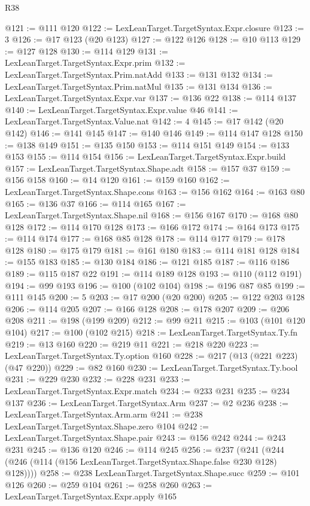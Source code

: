 \begin{lexlean}{R38}
\begin{coremodule}
@121 := @111 @120
@122 := LexLeanTarget.TargetSyntax.Expr.closure
@123 := 3
@126 := @17 @123 (@20 @123)
@127 := @122 @126
@128 := @10 @113
@129 := @127 @128
@130 := @114 @129
@131 := LexLeanTarget.TargetSyntax.Expr.prim
@132 := LexLeanTarget.TargetSyntax.Prim.natAdd
@133 := @131 @132
@134 := LexLeanTarget.TargetSyntax.Prim.natMul
@135 := @131 @134
@136 := LexLeanTarget.TargetSyntax.Expr.var
@137 := @136 @22
@138 := @114 @137
@140 := LexLeanTarget.TargetSyntax.Expr.value @46
@141 := LexLeanTarget.TargetSyntax.Value.nat
@142 := 4
@145 := @17 @142 (@20 @142)
@146 := @141 @145
@147 := @140 @146
@149 := @114 @147 @128
@150 := @138 @149
@151 := @135 @150
@153 := @114 @151 @149
@154 := @133 @153
@155 := @114 @154
@156 := LexLeanTarget.TargetSyntax.Expr.build
@157 := LexLeanTarget.TargetSyntax.Shape.adt
@158 := @157 @37
@159 := @156 @158
@160 := @14 @120
@161 := @159 @160
@162 := LexLeanTarget.TargetSyntax.Shape.cons
@163 := @156 @162
@164 := @163 @80
@165 := @136 @37
@166 := @114 @165
@167 := LexLeanTarget.TargetSyntax.Shape.nil
@168 := @156 @167
@170 := @168 @80 @128
@172 := @114 @170 @128
@173 := @166 @172
@174 := @164 @173
@175 := @114 @174
@177 := @168 @85 @128
@178 := @114 @177
@179 := @178 @128
@180 := @175 @179
@181 := @161 @180
@183 := @114 @181 @128
@184 := @155 @183
@185 := @130 @184
@186 := @121 @185
@187 := @116 @186
@189 := @115 @187 @22
@191 := @114 @189 @128
@193 := @110 (@112 @191)
@194 := @99 @193
@196 := @100 (@102 @104)
@198 := @196 @87 @85
@199 := @111 @145
@200 := 5
@203 := @17 @200 (@20 @200)
@205 := @122 @203 @128
@206 := @114 @205
@207 := @166 @128
@208 := @178 @207
@209 := @206 @208
@211 := @198 (@199 @209)
@212 := @99 @211
@215 := @103 (@101 @120 @104)
@217 := @100 (@102 @215)
@218 := LexLeanTarget.TargetSyntax.Ty.fn
@219 := @13 @160
@220 := @219 @11
@221 := @218 @220
@223 := LexLeanTarget.TargetSyntax.Ty.option @160
@228 := @217 (@13 (@221 @223) (@47 @220))
@229 := @82 @160
@230 := LexLeanTarget.TargetSyntax.Ty.bool
@231 := @229 @230
@232 := @228 @231
@233 := LexLeanTarget.TargetSyntax.Expr.match
@234 := @233 @231
@235 := @234 @137
@236 := LexLeanTarget.TargetSyntax.Arm
@237 := @2 @236
@238 := LexLeanTarget.TargetSyntax.Arm.arm
@241 := @238 LexLeanTarget.TargetSyntax.Shape.zero @104
@242 := LexLeanTarget.TargetSyntax.Shape.pair
@243 := @156 @242
@244 := @243 @231
@245 := @136 @120
@246 := @114 @245
@256 := @237
    (@241 (@244 (@246 (@114 (@156 LexLeanTarget.TargetSyntax.Shape.false @230 @128) @128))))
@258 := @238 LexLeanTarget.TargetSyntax.Shape.succ
@259 := @101 @126
@260 := @259 @104
@261 := @258 @260
@263 := LexLeanTarget.TargetSyntax.Expr.apply @165

\end{coremodule}
\end{lexlean}
